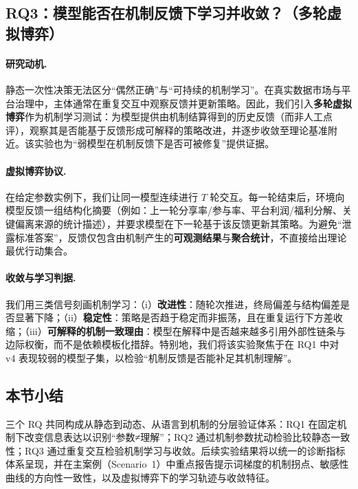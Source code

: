 \subsection{RQ3：模型能否在机制反馈下学习并收敛？（多轮虚拟博弈）}
\label{subsec:rq3}

\paragraph{研究动机.}
静态一次性决策无法区分“偶然正确”与“可持续的机制学习”。在真实数据市场与平台治理中，主体通常在重复交互中观察反馈并更新策略。因此，我们引入\textbf{多轮虚拟博弈}作为机制学习测试：为模型提供由机制结算得到的历史反馈（而非人工点评），观察其是否能基于反馈形成可解释的策略改进，并逐步收敛至理论基准附近。该实验也为“弱模型在机制反馈下是否可被修复”提供证据。

\paragraph{虚拟博弈协议.}
在给定参数实例下，我们让同一模型连续进行 $T$ 轮交互。每一轮结束后，环境向模型反馈一组结构化摘要（例如：上一轮分享率/参与率、平台利润/福利分解、关键偏离来源的统计描述），并要求模型在下一轮基于该反馈更新其策略。为避免“泄露标准答案”，反馈仅包含由机制产生的\textbf{可观测结果}与\textbf{聚合统计}，不直接给出理论最优行动集合。

\paragraph{收敛与学习判据.}
我们用三类信号刻画机制学习：（i）\textbf{改进性}：随轮次推进，终局偏差与结构偏差是否显著下降；（ii）\textbf{稳定性}：策略是否趋于稳定而非振荡，且在重复运行下方差收缩；（iii）\textbf{可解释的机制一致理由}：模型在解释中是否越来越多引用外部性链条与边际权衡，而不是依赖模板化措辞。特别地，我们将该实验聚焦于在 RQ1 中对 v4 表现较弱的模型子集，以检验“机制反馈是否能补足其机制理解”。

\subsection{本节小结}
\label{subsec:rq_summary}

三个 RQ 共同构成从静态到动态、从语言到机制的分层验证体系：RQ1 在固定机制下改变信息表达以识别“参数≠理解”；RQ2 通过机制参数扰动检验比较静态一致性；RQ3 通过重复交互检验机制学习与收敛。后续实验结果将以统一的诊断指标体系呈现，并在主案例（Scenario~1）中重点报告提示词梯度的机制拐点、敏感性曲线的方向性一致性，以及虚拟博弈下的学习轨迹与收敛特征。
